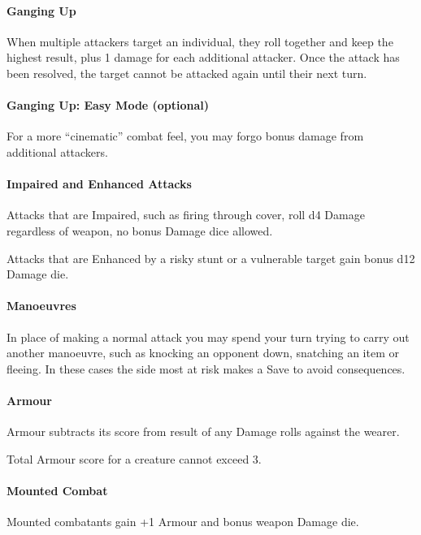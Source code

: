 \documentclass[itdr]{subfiles}
\begin{document}
\paragraph{Ganging Up}
When multiple attackers target an individual, they roll together and keep the highest result, plus 1 damage for each additional attacker. Once the attack has been resolved, the target cannot be attacked again until their next turn.

\begin{dbox}
\paragraph{Ganging Up: Easy Mode (optional)}
For a more ``cinematic'' combat feel, you may forgo bonus damage from additional attackers.
\end{dbox}

\paragraph{Impaired and Enhanced Attacks}
Attacks that are Impaired, such as firing through cover, roll d4 Damage regardless of weapon, no bonus Damage dice allowed.

Attacks that are Enhanced by a risky stunt or a vulnerable target gain bonus d12 Damage die.

\paragraph{Manoeuvres}
In place of making a normal attack you may spend your turn trying to carry out another manoeuvre, such as knocking an opponent down, snatching an item or fleeing. In these cases the side most at risk makes a Save to avoid consequences.

\paragraph{Armour}
Armour subtracts its score from result of any Damage rolls against the wearer.

Total Armour score for a creature cannot exceed 3.

\paragraph{Mounted Combat}
Mounted combatants gain +1 Armour and bonus weapon Damage die.
\end{document}
